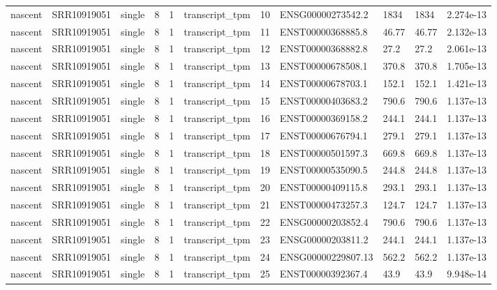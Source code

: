 \begin{tabular}{lllllllllll}
nascent & SRR10919051 & single & 8 & 1 & transcript\_tpm & 10 & ENSG00000273542.2 & 1834 & 1834 & 2.274e-13 \\
nascent & SRR10919051 & single & 8 & 1 & transcript\_tpm & 11 & ENST00000368885.8 & 46.77 & 46.77 & 2.132e-13 \\
nascent & SRR10919051 & single & 8 & 1 & transcript\_tpm & 12 & ENST00000368882.8 & 27.2 & 27.2 & 2.061e-13 \\
nascent & SRR10919051 & single & 8 & 1 & transcript\_tpm & 13 & ENST00000678508.1 & 370.8 & 370.8 & 1.705e-13 \\
nascent & SRR10919051 & single & 8 & 1 & transcript\_tpm & 14 & ENST00000678703.1 & 152.1 & 152.1 & 1.421e-13 \\
nascent & SRR10919051 & single & 8 & 1 & transcript\_tpm & 15 & ENST00000403683.2 & 790.6 & 790.6 & 1.137e-13 \\
nascent & SRR10919051 & single & 8 & 1 & transcript\_tpm & 16 & ENST00000369158.2 & 244.1 & 244.1 & 1.137e-13 \\
nascent & SRR10919051 & single & 8 & 1 & transcript\_tpm & 17 & ENST00000676794.1 & 279.1 & 279.1 & 1.137e-13 \\
nascent & SRR10919051 & single & 8 & 1 & transcript\_tpm & 18 & ENST00000501597.3 & 669.8 & 669.8 & 1.137e-13 \\
nascent & SRR10919051 & single & 8 & 1 & transcript\_tpm & 19 & ENST00000535090.5 & 244.8 & 244.8 & 1.137e-13 \\
nascent & SRR10919051 & single & 8 & 1 & transcript\_tpm & 20 & ENST00000409115.8 & 293.1 & 293.1 & 1.137e-13 \\
nascent & SRR10919051 & single & 8 & 1 & transcript\_tpm & 21 & ENST00000473257.3 & 124.7 & 124.7 & 1.137e-13 \\
nascent & SRR10919051 & single & 8 & 1 & transcript\_tpm & 22 & ENSG00000203852.4 & 790.6 & 790.6 & 1.137e-13 \\
nascent & SRR10919051 & single & 8 & 1 & transcript\_tpm & 23 & ENSG00000203811.2 & 244.1 & 244.1 & 1.137e-13 \\
nascent & SRR10919051 & single & 8 & 1 & transcript\_tpm & 24 & ENSG00000229807.13 & 562.2 & 562.2 & 1.137e-13 \\
nascent & SRR10919051 & single & 8 & 1 & transcript\_tpm & 25 & ENST00000392367.4 & 43.9 & 43.9 & 9.948e-14 \\
\bottomrule
\end{tabular}
